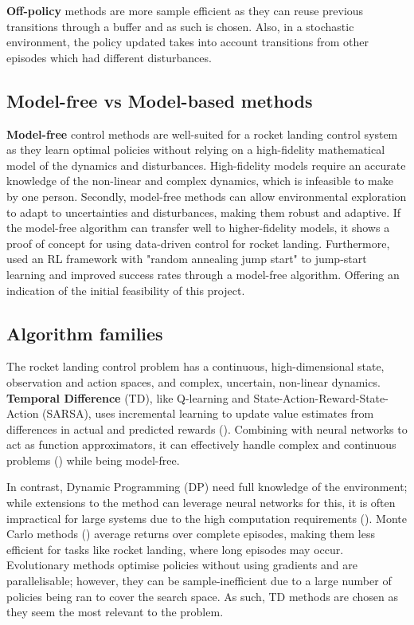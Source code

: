 \textbf{Off-policy} methods are more sample efficient as they can reuse previous transitions through a buffer and as such is chosen. Also, in a stochastic environment, the policy updated takes into account transitions from other episodes which had different disturbances.

\subsection{Model-free vs Model-based methods}
\label{sec:model_methods}

\textbf{Model-free} control methods are well-suited for a rocket landing control system as they learn optimal policies without relying on a high-fidelity mathematical model of the dynamics and disturbances. High-fidelity models require an accurate knowledge of the non-linear and complex dynamics, which is infeasible to make by one person. Secondly, model-free methods can allow environmental exploration to adapt to uncertainties and disturbances, making them robust and adaptive. If the model-free algorithm can transfer well to higher-fidelity models, it shows a proof of concept for using data-driven control for rocket landing. Furthermore, \cite{Jiang2024} used an RL framework with "random annealing jump start" to jump-start learning and improved success rates through a model-free algorithm. Offering an indication of the initial feasibility of this project.

\subsection{Algorithm families}
\label{sec:TD_MC_DP_ES}

The rocket landing control problem has a continuous, high-dimensional state, observation and action spaces, and complex, uncertain, non-linear dynamics. \textbf{Temporal Difference} (TD), like Q-learning and State-Action-Reward-State-Action (SARSA), uses incremental learning to update value estimates from differences in actual and predicted rewards (\cite{sutton1998reinforcement}). Combining with neural networks to act as function approximators, it can effectively handle complex and continuous problems (\cite{mnih2013playing}) while being model-free.

In contrast, Dynamic Programming (DP) need full knowledge of the environment; while extensions to the method can leverage neural networks for this, it is often impractical for large systems due to the high computation requirements (\cite{cmu2021recitation}). Monte Carlo methods (\cite{sutton1998reinforcement}) average returns over complete episodes, making them less efficient for tasks like rocket landing, where long episodes may occur. Evolutionary methods optimise policies without using gradients and are parallelisable; however, they can be sample-inefficient due to a large number of policies being ran to cover the search space. As such, TD methods are chosen as they seem the most relevant to the problem.